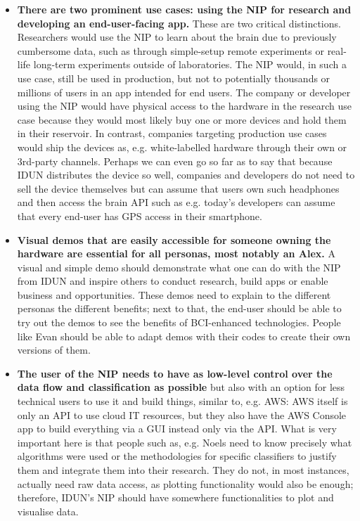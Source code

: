 \begin{itemize}
  \item \textbf{There are two prominent use cases: using the NIP for research and developing an end-user-facing app.} These are two critical distinctions. Researchers would use the NIP to learn about the brain due to previously cumbersome data, such as through simple-setup remote experiments or real-life long-term experiments outside of laboratories. The NIP would, in such a use case, still be used in production, but not to potentially thousands or millions of users in an app intended for end users. The company or developer using the NIP would have physical access to the hardware in the research use case because they would most likely buy one or more devices and hold them in their reservoir. In contrast, companies targeting production use cases would ship the devices as, e.g. white-labelled hardware through their own or 3rd-party channels. Perhaps we can even go so far as to say that because IDUN distributes the device so well, companies and developers do not need to sell the device themselves but can assume that users own such headphones and then access the brain API such as e.g. today's developers can assume that every end-user has GPS access in their smartphone.
  \item \textbf{Visual demos that are easily accessible for someone owning the hardware are essential for all personas, most notably an Alex.} A visual and simple demo should demonstrate what one can do with the NIP from IDUN and inspire others to conduct research, build apps or enable business and opportunities. These demos need to explain to the different personas the different benefits; next to that, the end-user should be able to try out the demos to see the benefits of BCI-enhanced technologies. People like Evan should be able to adapt demos with their codes to create their own versions of them.
  \item \textbf{The user of the NIP needs to have as low-level control over the data flow and classification as possible} but also with an option for less technical users to use it and build things, similar to, e.g. AWS: AWS itself is only an API to use cloud IT resources, but they also have the AWS Console app to build everything via a GUI instead only via the API. What is very important here is that people such as, e.g. Noels need to know precisely what algorithms were used or the methodologies for specific classifiers to justify them and integrate them into their research. They do not, in most instances, actually need raw data access, as plotting functionality would also be enough; therefore, IDUN's NIP should have somewhere functionalities to plot and visualise data.

\end{itemize}
